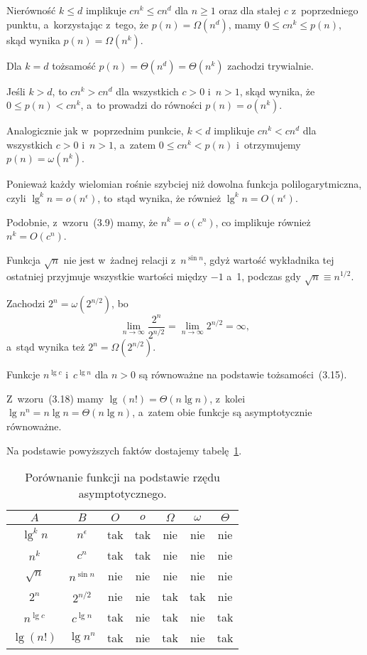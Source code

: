 \subproblem %
Nierówność $k\le d$ implikuje $cn^k\le cn^d$ dla $n\ge1$ oraz dla stałej $c$ z~poprzedniego punktu, a~korzystając z~tego, że $p(n)=\Omega(n^d)$, mamy $0\le cn^k\le p(n)$, skąd wynika $p(n)=\Omega(n^k)$.

\subproblem %
Dla $k=d$ tożsamość $p(n)=\Theta(n^d)=\Theta(n^k)$ zachodzi trywialnie.

\subproblem %
Jeśli $k>d$, to $cn^k>cn^d$ dla wszystkich $c>0$ i~$n>1$, skąd wynika, że $0\le p(n)<cn^k$, a~to prowadzi do równości $p(n)=o(n^k)$.

\subproblem %
Analogicznie jak w~poprzednim punkcie, $k<d$ implikuje $cn^k<cn^d$ dla wszystkich $c>0$ i~$n>1$, a~zatem $0\le cn^k<p(n)$ i~otrzymujemy $p(n)=\omega(n^k)$.


\subproblem %
Ponieważ każdy wielomian rośnie szybciej niż dowolna funkcja polilogarytmiczna, czyli $\lg^kn=o(n^\epsilon)$, to~stąd wynika, że również $\lg^kn=O(n^\epsilon)$.

\subproblem %
Podobnie, z~wzoru~(3.9) mamy, że $n^k=o(c^n)$, co implikuje również $n^k=O(c^n)$.

\subproblem %
Funkcja $\sqrt{n}$ nie jest w~żadnej relacji z~$n^{\sin n}$, gdyż wartość wykładnika tej ostatniej przyjmuje wszystkie wartości między $-1$ a~1, podczas gdy $\sqrt{n}\equiv n^{1/2}$.

\subproblem %
Zachodzi $2^n=\omega(2^{n/2})$, bo
\[
	\lim_{n\to\infty}\frac{2^n}{2^{n/2}} = \lim_{n\to\infty}2^{n/2} = \infty,
\]
a~stąd wynika też $2^n=\Omega(2^{n/2})$.

\subproblem %
Funkcje $n^{\lg c}$ i~$c^{\lg n}$ dla $n>0$ są równoważne na podstawie tożsamości~(3.15).

\subproblem %
Z~wzoru~(3.18) mamy $\lg(n!)=\Theta(n\lg n)$, z~kolei $\lg n^n=n\lg n=\Theta(n\lg n)$, a~zatem obie funkcje są asymptotycznie równoważne.

\bigskip
\noindent Na podstawie powyższych faktów dostajemy tabelę~\ref{tab:3-2}.
\begin{table}[ht]
	\begin{center}
		\begin{tabular}{cc|c|c|c|c|c}
			$A$ & $B$ & $O$ & $o$ & $\Omega$ & $\omega$ & $\Theta$ \\
			\hline
			$\lg^kn$ & $n^\epsilon$ & tak & tak & nie & nie & nie \\
			\hline
			$n^k$ & $c^n$ & tak & tak & nie & nie & nie \\
			\hline
			$\sqrt{n}$ & $n^{\sin n}$ & nie & nie & nie & nie & nie \\
			\hline
			$2^n$ & $2^{n/2}$ & nie & nie & tak & tak & nie \\
			\hline
			$n^{\lg c}$ & $c^{\lg n}$ & tak & nie & tak & nie & tak \\
			\hline
			$\lg(n!)$ & $\lg n^n$ & tak & nie & tak & nie & tak
		\end{tabular}
		\caption{Porównanie funkcji na podstawie rzędu asymptotycznego.} \label{tab:3-2}
	\end{center}
\end{table}

